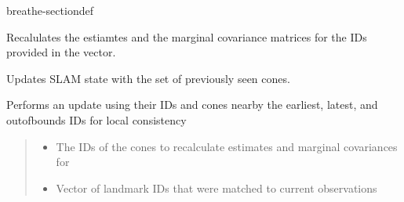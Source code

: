 \documentclass[letterpaper,10pt,english]{sphinxmanual}
\begin{document}
\begin{fulllineitems}
\begin{sphinxuseclass}{breathe-sectiondef}

\begin{fulllineitems}
\label{\detokenize{isam2:_CPPv4N4slam14SLAMEstAndMCov21update_with_old_conesERKNSt6vectorINSt6size_tEEE}}\label{\detokenize{isam2:_CPPv3N4slam14SLAMEstAndMCov21update_with_old_conesERKNSt6vectorINSt6size_tEEE}}\label{\detokenize{isam2:_CPPv2N4slam14SLAMEstAndMCov21update_with_old_conesERKNSt6vectorINSt6size_tEEE}}\label{\detokenize{isam2:slam::SLAMEstAndMCov::update_with_old_cones__std::vector:std::s:CR}}
\pysigstartsignatures
\pysigstartmultiline
\pysiglinewithargsret
{\label{\detokenize{isam2:classslam_1_1SLAMEstAndMCov_1a594aabd0f7b9b06d7420fa937ac6113f}}}
{}
{}
\pysigstopmultiline
\pysigstopsignatures
\sphinxAtStartPar
Recalulates the estiamtes and the marginal covariance matrices for the IDs provided in the vector. 

\sphinxAtStartPar
Updates SLAM state with the set of previously seen cones.

\sphinxAtStartPar

Performs an update using their IDs and cones nearby the earliest, latest, and out\sphinxhyphen{}of\sphinxhyphen{}bounds IDs for local consistency
\begin{quote}\begin{description}
\begin{itemize}
\item {} 
\sphinxAtStartPar
{} \textendash{} The IDs of the cones to recalculate estimates and marginal covariances for

\item {} 
\sphinxAtStartPar
{} \textendash{} Vector of landmark IDs that were matched to current observations 

\end{itemize}

\end{description}\end{quote}


\end{fulllineitems}
\end{sphinxuseclass}
\end{fulllineitems}
\end{document}
